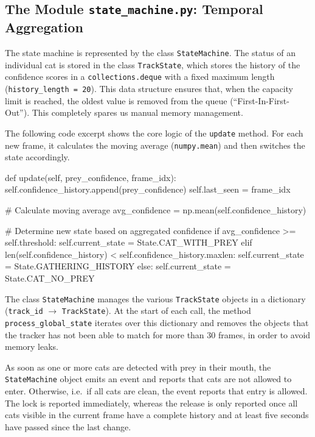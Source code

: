 \subsection{The Module \texttt{state\_machine.py}: Temporal Aggregation}
The state machine is represented by the class \texttt{StateMachine}. The status of an individual cat is stored in the class \texttt{TrackState}, which stores the history of the confidence scores in a \texttt{collections.deque} with a fixed maximum length (\texttt{history\_length = 20}). This data structure ensures that, when the capacity limit is reached, the oldest value is removed from the queue (``First-In-First-Out''). This completely spares us manual memory management.

The following code excerpt shows the core logic of the \texttt{update} method. For each new frame, it calculates the moving average (\texttt{numpy.mean}) and then switches the state accordingly.

\begin{PythonCode}[caption={State determination using a moving average}]
def update(self, prey_confidence, frame_idx):
    self.confidence_history.append(prey_confidence)
    self.last_seen = frame_idx

    # Calculate moving average
    avg_confidence = np.mean(self.confidence_history)

    # Determine new state based on aggregated confidence
    if avg_confidence >= self.threshold:
        self.current_state = State.CAT_WITH_PREY
    elif len(self.confidence_history) < self.confidence_history.maxlen:
        self.current_state = State.GATHERING_HISTORY
    else:
        self.current_state = State.CAT_NO_PREY
\end{PythonCode}

The class \texttt{StateMachine} manages the various \texttt{TrackState} objects in a dictionary (\texttt{track\_id} $\rightarrow$ \texttt{TrackState}). At the start of each call, the method \texttt{process\_global\_state} iterates over this dictionary and removes the objects that the tracker has not been able to match for more than 30 frames, in order to avoid memory leaks.

As soon as one or more cats are detected with prey in their mouth, the \texttt{StateMachine} object emits an event and reports that cats are not allowed to enter. Otherwise, i.e.\ if all cats are clean, the event reports that entry is allowed. The lock is reported immediately, whereas the release is only reported once all cats visible in the current frame have a complete history and at least five seconds have passed since the last change.

